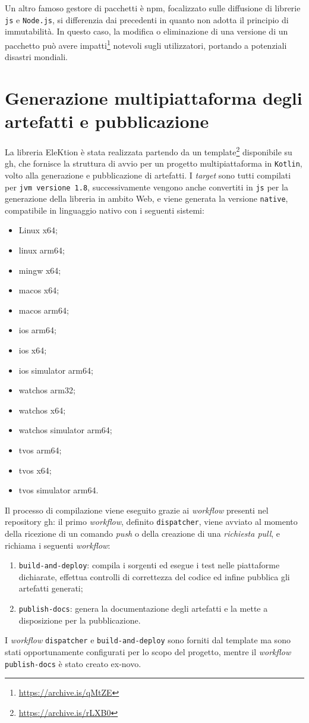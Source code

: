 \documentclass[12pt,a4paper,openright,twoside]{book}
\begin{document}
Un altro famoso gestore di pacchetti è \ac{npm}, focalizzato sulle diffusione di librerie \texttt{\ac{js}} e \texttt{Node.js},
si differenzia dai precedenti in quanto non adotta il principio di immutabilità.
In questo caso, la modifica o eliminazione di una versione di un pacchetto può avere impatti\footnote{\url{https://archive.is/qMtZE}} notevoli sugli utilizzatori,
portando a potenziali disastri mondiali.


\section{Generazione multipiattaforma degli artefatti e pubblicazione}
La libreria EleKtion è stata realizzata partendo da un template\footnote{\url{https://archive.is/rLXB0}} disponibile su \ac{gh}, che fornisce 
la struttura di avvio per un progetto multipiattaforma in \texttt{Kotlin}, volto alla generazione e pubblicazione di artefatti.
I \textit{target} sono tutti compilati per \texttt{\ac{jvm} versione 1.8}, successivamente vengono anche convertiti in \texttt{\ac{js}} per la generazione della
libreria in ambito Web, e viene generata la versione \texttt{native}, compatibile in linguaggio nativo con i seguenti sistemi:
\begin{itemize}
    \label{list:elencotargetgenerati}
    \item{Linux x64;}
    \item{linux arm64;}
    \item{mingw x64;}
    \item{macos x64;}
    \item{macos arm64;}
    \item{ios arm64;}
    \item{ios x64;}
    \item{ios simulator arm64;}
    \item{watchos arm32;}
    \item{watchos x64;}
    \item{watchos simulator arm64;}
    \item{tvos arm64;}
    \item{tvos x64;}
    \item{tvos simulator arm64.}
\end{itemize}
Il processo di compilazione viene eseguito grazie ai \textit{workflow} presenti nel repository \ac{gh}:
il primo \textit{workflow}, definito \texttt{dispatcher}, viene avviato al momento della ricezione di un comando \textit{push} o della creazione di
una \textit{richiesta pull}, e richiama i seguenti \textit{workflow}:
\begin{enumerate}
\item{\texttt{build-and-deploy}: compila i sorgenti ed esegue i test nelle piattaforme dichiarate, effettua controlli di correttezza del codice
ed infine pubblica gli artefatti generati;}
\item{\texttt{publish-docs}: genera la documentazione degli artefatti e la mette a disposizione per la pubblicazione.}
\end{enumerate}
I \textit{workflow} \texttt{dispatcher} e \texttt{build-and-deploy} sono forniti dal template ma sono stati opportunamente configurati per lo scopo del progetto,
mentre il \textit{workflow} \texttt{publish-docs} è stato creato ex-novo.
\end{document}
